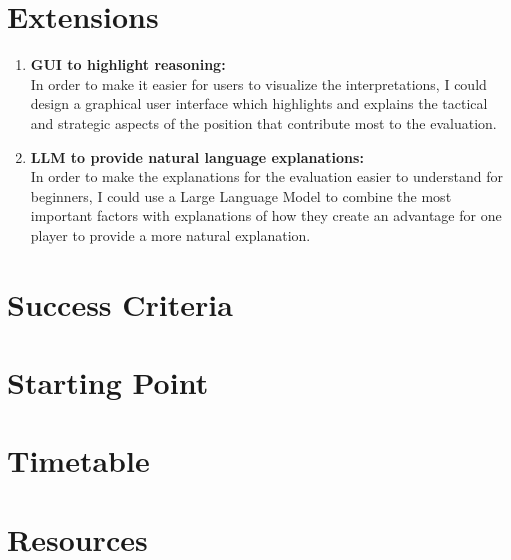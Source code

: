 \documentclass[10pt,a4paper]{article}
\begin{document}
\section*{Extensions}
\begin{enumerate}
    \item \textbf{GUI to highlight reasoning:}
    \\In order to make it easier for users to visualize the interpretations, I could design a graphical user interface which highlights and explains the tactical and strategic aspects of the position that contribute most to the evaluation.
    \item \textbf{LLM to provide natural language explanations:}
    \\In order to make the explanations for the evaluation easier to understand for beginners, I could use a Large Language Model to combine the most important factors with explanations of how they create an advantage for one player to provide a more natural explanation.
\end{enumerate}



\section*{Success Criteria}

\section*{Starting Point}

\section*{Timetable}

\section*{Resources}
\end{document}

